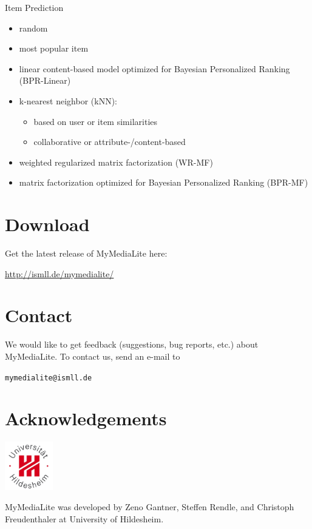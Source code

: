 \documentclass[a4paper, foldmark, 12pt]{leaflet}
\begin{document}
Item Prediction
\begin{itemize}
	\item random
	\item most popular item
	\item linear content-based model optimized for Bayesian Personalized Ranking (BPR-Linear)
	\item k-nearest neighbor (kNN):
		\begin{itemize}
			\item based on user or item similarities
			\item collaborative or attribute-/content-based
		\end{itemize}
	\item weighted regularized matrix factorization (WR-MF)
	\item matrix factorization optimized for Bayesian Personalized Ranking (BPR-MF)
\end{itemize}

\newpage

\section{Download}
Get the latest release of MyMediaLite here:
\begin{center}
	\url{http://ismll.de/mymedialite/}
\end{center}

\section{Contact}
We would like to get feedback (suggestions, bug reports, etc.) about MyMediaLite.
To contact us, send an e-mail to
\begin{center}
	\texttt{mymedialite@ismll.de}
\end{center}

\section{Acknowledgements}

\begin{floatingfigure}[r]{1.6cm}
	\vspace{-0.5cm}
	\includegraphics[width=2.1cm]{fig/uni-hildesheim-400x400.jpg}
\end{floatingfigure}
MyMediaLite was developed by Zeno Gantner,
Steffen Rendle, and Christoph Freudenthaler
at University of Hildesheim.
	
\end{document}
